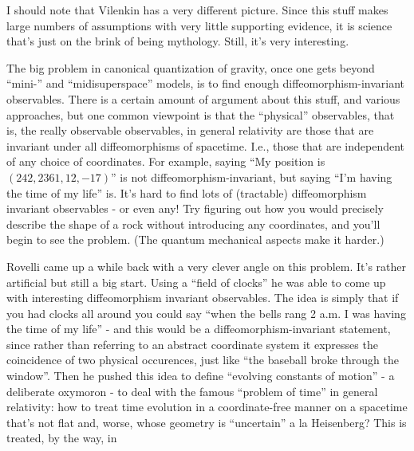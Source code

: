 \documentclass{article}
\def\tightlist{}
\renewcommand{\texttt}[1]{%
  \begingroup
  \ttfamily
  \begingroup\lccode`~=`/\lowercase{\endgroup\def~}{/\discretionary{}{}{}}%
  \begingroup\lccode`~=`[\lowercase{\endgroup\def~}{[\discretionary{}{}{}}%
  \begingroup\lccode`~=`.\lowercase{\endgroup\def~}{.\discretionary{}{}{}}%
  \catcode`/=\active\catcode`[=\active\catcode`.=\active
  \scantokens{#1\noexpand}%
  \endgroup
}
\begin{document}
I should note that Vilenkin has a very different picture. Since this
stuff makes large numbers of assumptions with very little supporting
evidence, it is science that's just on the brink of being mythology.
Still, it's very interesting.


The big problem in canonical quantization of gravity, once one gets
beyond ``mini-'' and ``midisuperspace'' models, is to find enough
diffeomorphism-invariant observables. There is a certain amount of
argument about this stuff, and various approaches, but one common
viewpoint is that the ``physical'' observables, that is, the really
observable observables, in general relativity are those that are
invariant under all diffeomorphisms of spacetime. I.e., those that are
independent of any choice of coordinates. For example, saying ``My
position is \((242,2361,12,-17)\)'' is not diffeomorphism-invariant, but
saying ``I'm having the time of my life'' is. It's hard to find lots of
(tractable) diffeomorphism invariant observables - or even any! Try
figuring out how you would precisely describe the shape of a rock
without introducing any coordinates, and you'll begin to see the
problem. (The quantum mechanical aspects make it harder.)

Rovelli came up a while back with a very clever angle on this problem.
It's rather artificial but still a big start. Using a ``field of
clocks'' he was able to come up with interesting diffeomorphism
invariant observables. The idea is simply that if you had clocks all
around you could say ``when the bells rang 2 a.m. I was having the time
of my life'' - and this would be a diffeomorphism-invariant statement,
since rather than referring to an abstract coordinate system it
expresses the coincidence of two physical occurences, just like ``the
baseball broke through the window''. Then he pushed this idea to define
``evolving constants of motion'' - a deliberate oxymoron - to deal with
the famous ``problem of time'' in general relativity: how to treat time
evolution in a coordinate-free manner on a spacetime that's not flat
and, worse, whose geometry is ``uncertain'' a la Heisenberg? This is
treated, by the way, in
\end{document}
